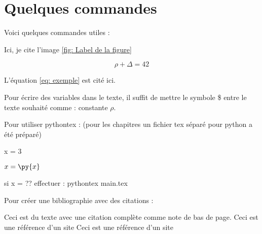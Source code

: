 
\section{Quelques commandes}

Voici quelques commandes utiles :


Ici, je cite l'image \ref{fig: Label de la figure}



\begin{equation} \label{eq: exemple}
\rho + \Delta = 42
\end{equation}

L'équation \ref{eq: exemple} est cité ici. 


Pour écrire des variables dans le texte, il suffit de mettre le symbole \$ entre le texte souhaité comme : constante $\rho$.

Pour utiliser pythontex : (pour les chapitres un fichier tex séparé pour python a été préparé)
\begin{pycode}
x = 3
\end{pycode}
       
$x = \py{x}$

si x = ?? effectuer :
pythontex main.tex


Pour créer une bibliographie avec des citations :

Ceci est du texte avec une citation complète comme note de bas de page.
Ceci est une référence d'un site 
Ceci est une référence d'un site 
